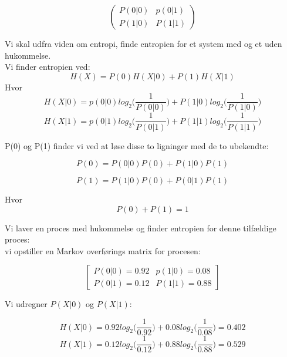 \[ \left( \begin{array}{ccc}
P(0|0) & p(0|1)  \\
P(1|0) & P(1|1) \end{array} \right)\] 

Vi skal udfra viden om entropi, finde entropien for et system med og et uden hukommelse.\\
Vi finder entropien ved:
\begin{equation}
H(X) = P(0)H(X|0)+P(1)H(X|1)
\end{equation}
Hvor
\begin{equation}
H(X|0)=p(0|0)log_2 \bigg(\frac{1}{P(0|0)}\bigg)+P(1|0)log_2\bigg(\frac{1}{P(1|0)}\bigg)
\end{equation}
\begin{equation}
H(X|1)=p(0|1)log_2 \bigg(\frac{1}{P(0|1)}\bigg)+P(1|1)log_2\bigg(\frac{1}{P(1|1)}\bigg)
\end{equation}

P(0) og P(1) finder vi ved at løse disse to ligninger med de to ubekendte:

\begin{equation}
P(0) = P(0|0)P(0)+P(1|0)P(1)
\end{equation}

\begin{equation}
P(1)=P(1|0)P(0)+P(0|1)P(1)
\end{equation}

Hvor
\begin{equation}
P(0)+P(1)=1
\end{equation}

Vi laver en proces med hukommelse og finder entropien for denne tilfældige proces:\\ vi opstiller en Markov overførings matrix for procesen:

\[ \left[ \begin{array}{ccc}
P(0|0) = 0.92 & p(1|0) = 0.08   \\
P(0|1) = 0.12  & P(1|1) = 0.88  \end{array} \right]\] 

Vi udregner $P(X|0)$ og $P(X|1)$:

\begin{equation}
H(X|0)=0.92log_2 \bigg(\frac{1}{0.92}\bigg)+0.08log_2\bigg(\frac{1}{0.08}\bigg) = 0.402
\end{equation}
\begin{equation}
H(X|1)=0.12log_2 \bigg(\frac{1}{0.12}\bigg)+0.88log_2\bigg(\frac{1}{0.88}\bigg) = 0.529
\end{equation}

